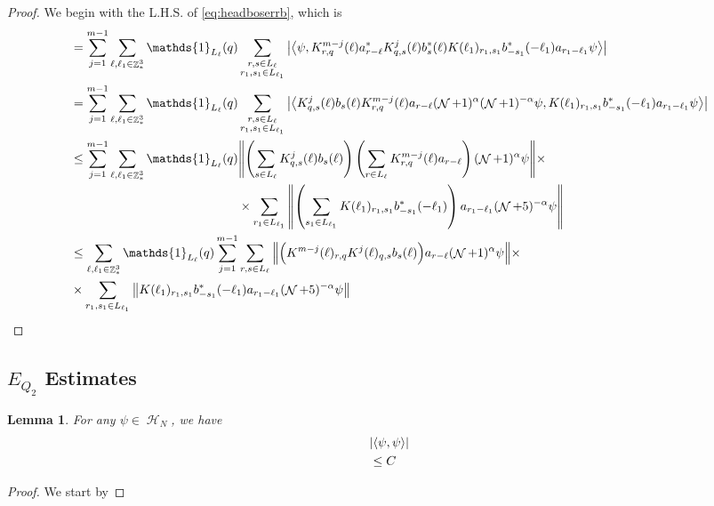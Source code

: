 \documentclass[sn-mathphys, Numbered ,a4paper]{sn-jnl}%
\DeclareMathOperator{\Z}{\mathbb{Z}}
\DeclareMathOperator{\HH}{\mathcal{H}}
\DeclareMathOperator{\NN}{\mathcal{N}}
\newcommand{\eva}[1]{\left\langle #1 \right\rangle}
\theoremstyle{plain}
\newtheorem{lemma}[theorem]{Lemma}
\theoremstyle{definition}
\theoremstyle{remark}
\theoremstyle{plain}
\theoremstyle{definition}
\theoremstyle{remark}
\begin{document}
\begin{proof}
	We begin with the L.H.S. of \eqref{eq:headboserrb}, which is 
	\begin{alignat}{2}
		&= \sum_{j=1}^{m-1}\sum\limits_{\ell,\ell_1 \in \Z^3_*} \mathds{1}_{L_\ell}(q) \sum\limits_{\substack{r,s \in L_{\ell}\\r_1,s_1\in L_{\ell_1}}}  \abs{\eva{\psi, K^{m-j}_{r,q}(\ell)  a^*_{r-\ell} K^{j}_{q,s}(\ell)b^*_{s}(\ell) K(\ell_1)_{r_1,s_1}b^*_{-s_1}(-\ell_1) a_{r_1-\ell_1} \psi }}\nonumber\\
		&= \sum_{j=1}^{m-1}\sum\limits_{\ell,\ell_1 \in \Z^3_*} \mathds{1}_{L_\ell}(q) \sum\limits_{\substack{r,s \in L_{\ell}\\r_1,s_1\in L_{\ell_1}}}  \abs{\eva{ K^{j}_{q,s}(\ell)b_{s}(\ell)  K^{m-j}_{r,q}(\ell)a_{r-\ell}(\NN+1)^{\alpha}(\NN+1)^{-\alpha}\psi,  K(\ell_1)_{r_1,s_1}b^*_{-s_1}(-\ell_1) a_{r_1-\ell_1} \psi }}\nonumber\\
		&\leq \sum_{j=1}^{m-1} \sum\limits_{\ell,\ell_1 \in \Z^3_*} \mathds{1}_{L_\ell}(q) 
		\begin{aligned}[t]
			&  \norm{ \left(\sum\limits_{s \in L_{\ell}}K^{j}_{q,s}(\ell)b_{s}(\ell)\right) \left(\sum\limits_{r \in L_{\ell}}K^{m-j}_{r,q}(\ell)a_{r-\ell}\right)(\NN+1)^{\alpha}\psi}\times\nonumber\\&\times
			\sum\limits_{r_1\in L_{\ell_1}}\norm{ \left(\sum\limits_{s_1\in L_{\ell_1}}K(\ell_1)_{r_1,s_1} b^*_{-s_1}(-\ell_1)\right) a_{r_1-\ell_1} (\NN+5)^{-\alpha} \psi }\nonumber\\    
		\end{aligned}\nonumber\\
		&\leq \sum\limits_{\ell,\ell_1 \in \Z^3_*}  \mathds{1}_{L_\ell}(q) \sum_{j=1}^{m-1} \sum\limits_{r,s \in L_{\ell}}  \norm{  \Big(K^{m-j}(\ell)_{r,q}K^{j}(\ell)_{q,s}b_{s}(\ell)\Big) a_{r-\ell}(\NN+1)^{\alpha}\psi}\times\nonumber\\&\times\sum\limits_{r_1,s_1\in L_{\ell_1}}\norm{
			K(\ell_1)_{r_1,s_1}b^*_{-s_1}(-\ell_1) a_{r_1-\ell_1} (\NN+5)^{-\alpha}\psi }\nonumber\\
	\end{alignat}
\end{proof}



\subsection{$E_{Q_2}$ Estimates}
\begin{lemma}
    For any $\psi \in \HH_N$, we have
    \begin{align}
        &\abs{\eva{\psi,   \psi}}\nonumber\\&\leq C
    \end{align}
\end{lemma}
\begin{proof}
    We start by
\end{proof}
\end{document}
